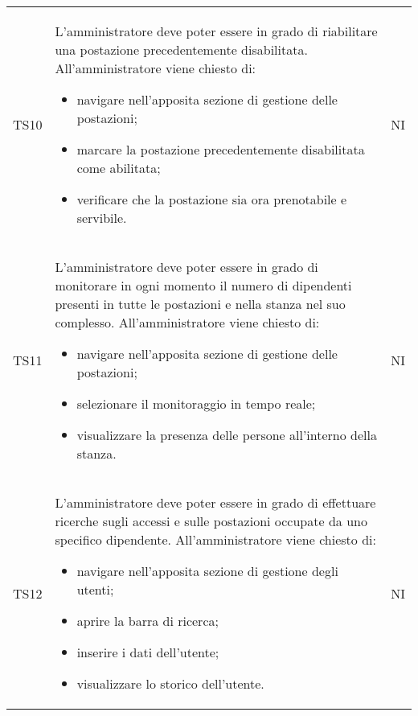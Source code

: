 {\begin{longtable}{ c C{11cm} c }
        TS10&
        \begin{flushleft}
            L'amministratore deve poter essere in grado di riabilitare una postazione precedentemente disabilitata.
            All'amministratore viene chiesto di:
        \end{flushleft}
        \begin{itemize}
            \item navigare nell'apposita sezione di gestione delle postazioni;
            \item marcare la postazione precedentemente disabilitata come abilitata;
            \item verificare che la postazione sia ora prenotabile e servibile.
        \end{itemize}&
        NI\\

        TS11&
        \begin{flushleft}
            L'amministratore deve poter essere in grado di monitorare in ogni momento il numero di dipendenti presenti in tutte le postazioni e nella stanza nel suo complesso.
            All'amministratore viene chiesto di:
        \end{flushleft}
        \begin{itemize}
            \item navigare nell'apposita sezione di gestione delle postazioni;
            \item selezionare il monitoraggio in tempo reale;
            \item visualizzare la presenza delle persone all'interno della stanza.
        \end{itemize}&
        NI\\

        TS12&
        \begin{flushleft}
            L'amministratore deve poter essere in grado di effettuare ricerche sugli accessi e sulle postazioni occupate da uno specifico dipendente.
            All'amministratore viene chiesto di:
        \end{flushleft}
        \begin{itemize}
            \item navigare nell'apposita sezione di gestione degli utenti;
            \item aprire la barra di ricerca;
            \item inserire i dati dell'utente;
            \item visualizzare lo storico dell'utente.
        \end{itemize}&
        NI\\


\end{longtable}}

